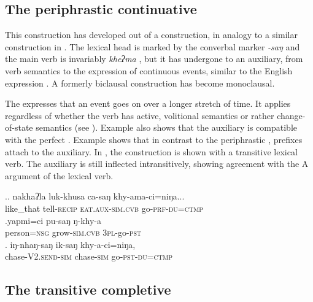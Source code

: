 \subsection{The periphrastic continuative}

This construction has developed out of a  construction, in analogy to a similar construction in . The lexical head is marked by the converbal marker \emph{-saŋ} and the  main verb is invariably \emph{kheʔma} , but it has undergone  to an auxiliary, from  verb semantics to the expression of continuous events, similar to the English expression . A formerly biclausal construction has become monoclausal.

The  expresses that an event goes on over a longer stretch of time. It applies regardless of whether the verb has active, volitional semantics \Next[a] or rather change-of-state semantics (see \Next[b]). Example \Next[a] also shows that the auxiliary is compatible  with the perfect . Example \Next[b] shows that in contrast to the periphrastic , prefixes attach to the auxiliary. In \Next[c], the construction is shown with a transitive lexical verb. The auxiliary is still inflected intransitively, showing agreement with the A argument of the lexical verb.  
 	
\ex.\ag. nakhaʔla   luk-khusa    ca-saŋ           khy-ama-ci=niŋa...\\
like\_that tell{\scshape -recip} {\scshape eat.aux-sim.cvb} go{\scshape -prf-du=ctmp}\\
 
\bg.yapmi=ci pu-saŋ ŋ-khy-a\\
person{\scshape =nsg} grow{\scshape -sim.cvb}  {\scshape 3pl-}go{\scshape -pst}\\
 
 \bg.      iŋ-nhaŋ-saŋ            ik-saŋ         khy-a-ci=niŋa,\\
 chase{\scshape -V2.send-sim} chase{\scshape -sim} go{\scshape -pst-du=ctmp}\\
  
 
\subsection{The transitive completive}\label{completive}
 
